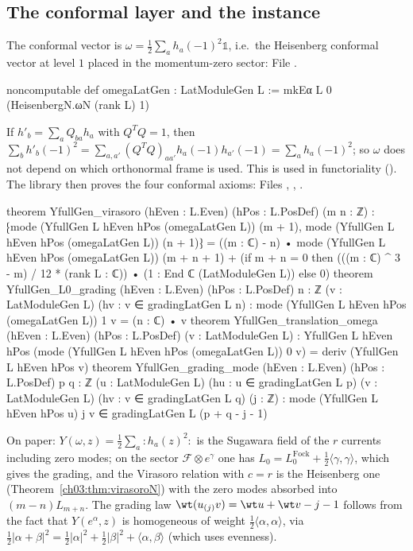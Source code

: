 \subsection{The conformal layer and the instance}

The conformal vector is $\omega=\frac12\sum_ah_a(-1)^2\mathbb 1$, i.e.\ the Heisenberg conformal
vector at level $1$ placed in the momentum-zero sector:
\noindent File .
\begin{leancode}
noncomputable def omegaLatGen : LatModuleGen L := mkEα L 0 (HeisenbergN.ωN (rank L) 1)
\end{leancode}
If $h'_b=\sum_aQ_{ba}h_a$ with $Q^TQ=1$, then $\sum_bh'_b(-1)^2=\sum_{a,a'}(Q^TQ)_{aa'}
h_a(-1)h_{a'}(-1)=\sum_ah_a(-1)^2$; so $\omega$ does not depend on which orthonormal frame is used.
This is used in functoriality (). The library then proves the four conformal axioms:
\noindent Files , , .
\begin{leancode}
theorem YfullGen_virasoro (hEven : L.Even) (hPos : L.PosDef) (m n : ℤ) :
    ⁅mode (YfullGen L hEven hPos (omegaLatGen L)) (m + 1),
      mode (YfullGen L hEven hPos (omegaLatGen L)) (n + 1)⁆
      = ((m : ℂ) - n) • mode (YfullGen L hEven hPos (omegaLatGen L)) (m + n + 1)
        + (if m + n = 0 then (((m : ℂ) ^ 3 - m) / 12 * (rank L : ℂ)) • (1 : End ℂ (LatModuleGen L))
           else 0)
theorem YfullGen_L0_grading (hEven : L.Even) (hPos : L.PosDef) {n : ℤ} (v : LatModuleGen L)
    (hv : v ∈ gradingLatGen L n) :
    mode (YfullGen L hEven hPos (omegaLatGen L)) 1 v = (n : ℂ) • v
theorem YfullGen_translation_omega (hEven : L.Even) (hPos : L.PosDef) (v : LatModuleGen L) :
    YfullGen L hEven hPos (mode (YfullGen L hEven hPos (omegaLatGen L)) 0 v)
      = deriv (YfullGen L hEven hPos v)
theorem YfullGen_grading_mode (hEven : L.Even) (hPos : L.PosDef) {p q : ℤ} (u : LatModuleGen L)
    (hu : u ∈ gradingLatGen L p) (v : LatModuleGen L) (hv : v ∈ gradingLatGen L q) (j : ℤ) :
    mode (YfullGen L hEven hPos u) j v ∈ gradingLatGen L (p + q - j - 1)
\end{leancode}
On paper: $Y(\omega,z)=\frac12\sum_a{:}h_a(z)^2{:}$ is the Sugawara field of the $r$ currents
including zero modes; on the sector $\mathcal F\otimes e^\gamma$ one has
$L_0=L_0^{\mathrm{Fock}}+\frac12\langle\gamma,\gamma\rangle$, which gives the grading, and the
Virasoro relation with $c=r$ is the Heisenberg one (Theorem~\ref{ch03:thm:virasoroN}) with the
zero modes absorbed into $(m-n)L_{m+n}$. The grading law
$\wt(u_{(j)}v)=\wt u+\wt v-j-1$ follows from the fact that $Y(e^\alpha,z)$ is homogeneous of
weight $\frac12\langle\alpha,\alpha\rangle$, via
$\frac12|\alpha+\beta|^2=\frac12|\alpha|^2+\frac12|\beta|^2+\langle\alpha,\beta\rangle$ (which uses
evenness).

